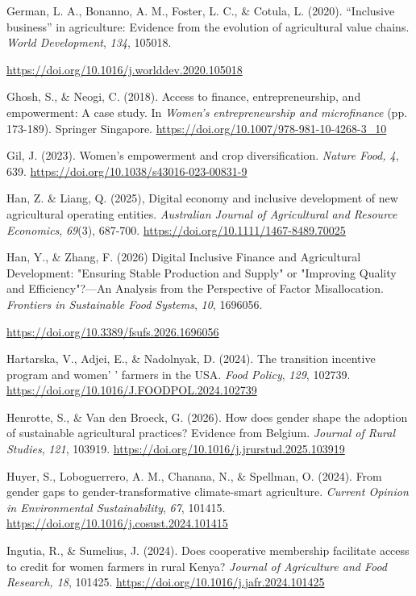 \documentclass[
]{article}
\begin{document}
German, L. A., Bonanno, A. M., Foster, L. C., \& Cotula, L. (2020).
``Inclusive business'' in agriculture: Evidence from the evolution of
agricultural value chains. \emph{World Development}, \emph{134}, 105018.

\url{https://doi.org/10.1016/j.worlddev.2020.105018}

Ghosh, S., \& Neogi, C. (2018). Access to finance, entrepreneurship, and
empowerment: A case study. In \emph{Women's entrepreneurship and
microfinance} (pp. 173-189). Springer Singapore.
\url{https://doi.org/10.1007/978-981-10-4268-3_10}

Gil, J. (2023). Women's empowerment and crop diversification.
\emph{Nature Food, 4}, 639.
\url{https://doi.org/10.1038/s43016-023-00831-9}

Han, Z. \& Liang, Q. (2025), Digital economy and inclusive development
of new agricultural operating entities. \emph{Australian Journal of
Agricultural and Resource Economics}, \emph{69}(3), 687-700.
\url{https://doi.org/10.1111/1467-8489.70025}

Han, Y., \& Zhang, F. (2026) Digital Inclusive Finance and Agricultural
Development: "Ensuring Stable Production and Supply" or "Improving
Quality and Efficiency"?---An Analysis from the Perspective of Factor
Misallocation. \emph{Frontiers in Sustainable Food Systems}, \emph{10},
1696056.

\url{https://doi.org/10.3389/fsufs.2026.1696056}

Hartarska, V., Adjei, E., \& Nadolnyak, D. (2024). The transition
incentive program and women' ' farmers in the USA. \emph{Food Policy},
\emph{129}, 102739. \url{https://doi.org/10.1016/J.FOODPOL.2024.102739}

Henrotte, S., \& Van den Broeck, G. (2026). How does gender shape the
adoption of sustainable agricultural practices? Evidence from Belgium.
\emph{Journal of Rural Studies}, \emph{121}, 103919.
\url{https://doi.org/10.1016/j.jrurstud.2025.103919}

Huyer, S., Loboguerrero, A. M., Chanana, N., \& Spellman, O. (2024).
From gender gaps to gender-transformative climate-smart agriculture.
\emph{Current Opinion in Environmental Sustainability}, \emph{67},
101415. \url{https://doi.org/10.1016/j.cosust.2024.101415}

Ingutia, R., \& Sumelius, J. (2024). Does cooperative membership
facilitate access to credit for women farmers in rural Kenya?
\emph{Journal of Agriculture and Food Research, 18}, 101425.
\url{https://doi.org/10.1016/j.jafr.2024.101425}
\end{document}
